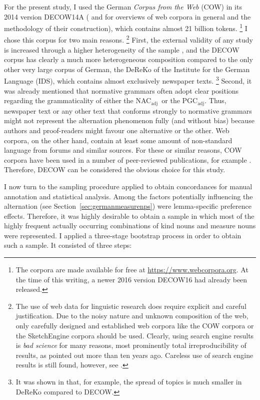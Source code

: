 \documentclass[USenglish]{article}
\newcommand{\Sub}[1]{\ensuremath{\mathrm{_{#1}}}}
\newcommand{\NACa}{NAC\Sub{adj}}
\newcommand{\PGCa}{PGC\Sub{adj}}
\begin{document}
For the present study, I used the German \textit{Corpus from the Web} (COW) in its 2014 version DECOW14A (\citealp{SchaeferBildhauer2012full,Schaefer2015b} and \citealp{BiemannEa2013,SchaeferBildhauer2013} for overviews of web corpora in general and the methodology of their construction), which contains almost 21 billion tokens.%
\footnote{The corpora are made available for free at \url{https://www.webcorpora.org}.
At the time of this writing, a newer 2016 version DECOW16 had already been released.}
I chose this corpus for two main reasons.%
\footnote{The use of web data for linguistic research does require explicit and careful justification.
Due to the noisy nature and unknown composition of the web, only carefully designed and established web corpora like the COW corpora or the SketchEngine corpora \citep{KilgarriffEa2014} should be used.
Clearly, using search engine results is \textit{bad science} for many reasons, most prominently total irreproducibility of results, as \cite{Kilgarriff2006} pointed out more than ten years ago.
Careless use of search engine results is still found, however, see \citet[171--175]{DeclerckBrems2016}.}
First, the external validity of any study is increased through a higher heterogeneity of the sample \citep[30]{MaxwellDelaney2004}, and the DECOW corpus has clearly a much more heterogeneous composition compared to the only other very large corpus of German, the DeReKo \citep{KupietzEa2010} of the Institute for the German Language (IDS), which contains almost exclusively newspaper texts.%
\footnote{It was shown in \cite{W16-2601} that, for example, the spread of topics is much smaller in DeReKo compared to DECOW.}
Second, it was already mentioned that normative grammars often adopt clear positions regarding the grammaticality of either the \NACa\ or the \PGCa.
Thus, newspaper text or any other text that conforms strongly to normative grammars might not represent the alternation phenomenon fully (and without bias) because authors and proof-readers might favour one alternative or the other.
Web corpora, on the other hand, contain at least some amount of non-standard language from forums and similar sources.
For these or similar reasons, COW corpora have been used in a number of peer-reviewed publications, for example \cite{VanGoethemHiligsmann2014,VanGoethemHuening2015,MuellerS2014,Schaefer2016c,SchaeferSayatz2014,SchaeferSayatz2016,Zimmer2015}. 
Therefore, DECOW can be considered the obvious choice for this study.

I now turn to the sampling procedure applied to obtain concordances for manual annotation and statistical analysis.
Among the factors potentially influencing the alternation (see Section~\ref{sec:germanmeasurenps}) were lemma-specific preference effects.
Therefore, it was highly desirable to obtain a sample in which most of the highly frequent actually occurring combinations of kind nouns and measure nouns were represented.
I applied a three-stage bootstrap process in order to obtain such a sample.
It consisted of three steps:
\end{document}

